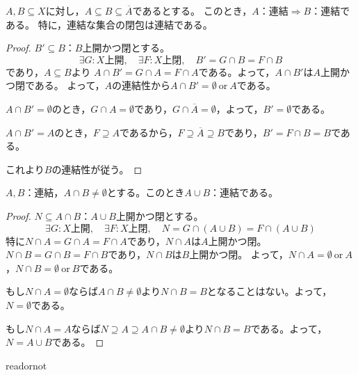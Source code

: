 \documentclass[uplatex]{jsarticle}
\begin{document}
\begin{prop}
  $A, B \subseteq X$に対し，$A \subseteq B \subseteq \overline{A}$であるとする。
  このとき，$A$：連結$\Longrightarrow B$：連結である。
  特に，連結な集合の閉包は連結である。
\end{prop}

\begin{proof}
  $B' \subseteq B$：$B$上開かつ閉とする。
  \begin{equation}
    \exists G: X\text{上開},\quad \exists F: X\text{上閉}, \quad B' = G \cap B = F \cap B
  \end{equation}
  であり，$A \subseteq B$より
  $A \cap B' = G \cap A = F \cap A$である。よって，$A \cap B'$は$A$上開かつ閉である。
  よって，$A$の連結性から$A \cap B' = \emptyset \: \text{or} \: A$である。

  $A \cap B' = \emptyset$のとき，$G \cap A = \emptyset$であり，$G \cap \overline{A} = \emptyset$，よって，$B' = \emptyset$である。

  $A \cap B' = A$のとき，$F \supseteq A$であるから，$F \supseteq \overline{A} \supseteq B$であり，$B' = F \cap B = B$である。

  これより$B$の連結性が従う。
\end{proof}

\begin{prop}
  $A,B$：連結，$A \cap B \neq \emptyset$とする。このとき$A \cup B$：連結である。
\end{prop}

\begin{proof}
  $N \subseteq A \cap B$：$A \cup B$上開かつ閉とする。
  \begin{equation}
    \exists G: X\text{上開},\quad \exists F: X\text{上閉}, \quad N = G \cap (A \cup B) = F \cap (A \cup B)
  \end{equation}
  特に$N \cap A = G \cap A = F \cap A$であり，$N \cap A$は$A$上開かつ閉。
  $N \cap B = G \cap B = F \cap B$であり，$N \cap B$は$B$上開かつ閉。
  よって，$N \cap A = \emptyset \: \text{or} \: A$，$N \cap B = \emptyset \: \text{or} \: B$である。

  もし$N \cap A = \emptyset$ならば$A \cap B \neq \emptyset$より$N \cap B = B$となることはない。よって，$N = \emptyset$である。

  もし$N \cap A = A$ならば$N \supseteq A \supseteq A \cap B \neq \emptyset$より$N \cap B = B$である。よって，$N = A \cup B$である。
\end{proof}

\expandafter\ifx\csname readornot\endcsname\relax
  
\end{document}
